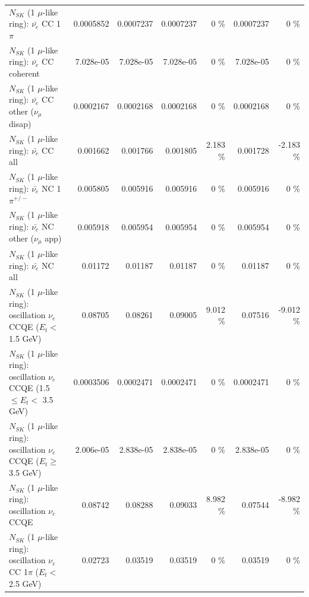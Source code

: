 \begin{table}
\begin{tabular}{| l | r | r | r  r | r  r |}
\hline
                           $N_{SK}$ (1 $\mu$-like ring): $\bar{\nu_e}$ CC 1$\pi$ &       0.0005852 &       0.0007237 &       0.0007237 &        0 \%  &       0.0007237 &        0 \%  \\ 
                         $N_{SK}$ (1 $\mu$-like ring): $\bar{\nu_e}$ CC coherent &       7.028e-05 &       7.028e-05 &       7.028e-05 &        0 \%  &       7.028e-05 &        0 \%  \\ 
          $N_{SK}$ (1 $\mu$-like ring): $\bar{\nu_e}$ CC other ($\nu_\mu$ disap) &       0.0002167 &       0.0002168 &       0.0002168 &        0 \%  &       0.0002168 &        0 \%  \\ 
                            $N_{SK}$ (1 $\mu$-like ring): $\bar{\nu_{e}}$ CC all &        0.001662 &        0.001766 &        0.001805 &    2.183 \%  &        0.001728 &   -2.183 \%  \\ 
\hline
                     $N_{SK}$ (1 $\mu$-like ring): $\bar{\nu_e}$ NC 1$\pi^{+/-}$ &        0.005805 &        0.005916 &        0.005916 &        0 \%  &        0.005916 &        0 \%  \\ 
            $N_{SK}$ (1 $\mu$-like ring): $\bar{\nu_e}$ NC other ($\nu_\mu$ app) &        0.005918 &        0.005954 &        0.005954 &        0 \%  &        0.005954 &        0 \%  \\ 
                            $N_{SK}$ (1 $\mu$-like ring): $\bar{\nu_{e}}$ NC all &         0.01172 &         0.01187 &         0.01187 &        0 \%  &         0.01187 &        0 \%  \\ 
\hline
\hline
\hline
      $N_{SK}$ (1 $\mu$-like ring): oscillation $\nu_e$ CCQE ($E_{t} <$ 1.5 GeV) &         0.08705 &         0.08261 &         0.09005 &    9.012 \%  &         0.07516 &   -9.012 \%  \\ 
$N_{SK}$ (1 $\mu$-like ring): oscillation $\nu_e$ CCQE (1.5 $\leq E_{t} <$ 3.5 GeV) &       0.0003506 &       0.0002471 &       0.0002471 &        0 \%  &       0.0002471 &        0 \%  \\ 
   $N_{SK}$ (1 $\mu$-like ring): oscillation $\nu_e$ CCQE ($E_{t} \geq$ 3.5 GeV) &       2.006e-05 &       2.838e-05 &       2.838e-05 &        0 \%  &       2.838e-05 &        0 \%  \\ 
\hline
                          $N_{SK}$ (1 $\mu$-like ring): oscillation $\nu_e$ CCQE &         0.08742 &         0.08288 &         0.09033 &    8.982 \%  &         0.07544 &   -8.982 \%  \\ 
\hline
 $N_{SK}$ (1 $\mu$-like ring): oscillation $\nu_e$ CC 1$\pi$ ($E_{t} <$ 2.5 GeV) &         0.02723 &         0.03519 &         0.03519 &        0 \%  &         0.03519 &        0 \%  \\ 

\end{tabular}
\end{table}
